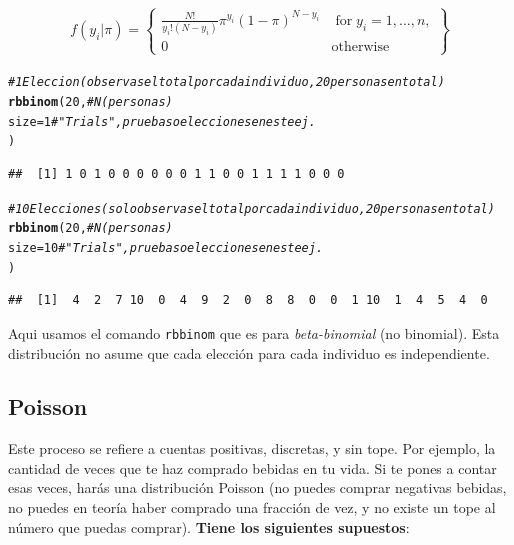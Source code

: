 \documentclass[onesided]{article}\usepackage[]{graphicx}\usepackage[]{color}
\makeatletter
\newcommand{\hlnum}[1]{\textcolor[rgb]{0.686,0.059,0.569}{#1}}%
\newcommand{\hlcom}[1]{\textcolor[rgb]{0.678,0.584,0.686}{\textit{#1}}}%
\newcommand{\hlstd}[1]{\textcolor[rgb]{0.345,0.345,0.345}{#1}}%
\newcommand{\hlkwc}[1]{\textcolor[rgb]{0.333,0.667,0.333}{#1}}%
\newcommand{\hlkwd}[1]{\textcolor[rgb]{0.737,0.353,0.396}{\textbf{#1}}}%
\newenvironment{kframe}{%
 \def\at@end@of@kframe{}%
 \ifinner\ifhmode%
  \def\at@end@of@kframe{\end{minipage}}%
  \begin{minipage}{\columnwidth}%
 \fi\fi%
 \def\FrameCommand##1{\hskip\@totalleftmargin \hskip-\fboxsep
 \colorbox{shadecolor}{##1}\hskip-\fboxsep
     \hskip-\linewidth \hskip-\@totalleftmargin \hskip\columnwidth}%
 \MakeFramed {\advance\hsize-\width
   \@totalleftmargin\z@ \linewidth\hsize
   \@setminipage}}%
 {\par\unskip\endMakeFramed%
 \at@end@of@kframe}
\newenvironment{knitrout}{}{} %
\makeatother
\begin{document}
\begin{equation}\label{Binomial}
\begin{split}
f(y_{i}|\pi) =	\begin{Bmatrix} \frac{N!}{y_{i}!(N-y_{i})} \pi^{y_{i}}(1-\pi)^{N-y_{i}} & \;\text{for}\; y_{i}=1,\ldots,n, \\ 
0 & \text{otherwise} \end{Bmatrix}
\end{split}
\end{equation}


\begin{knitrout}
\color{fgcolor}\begin{kframe}
\begin{alltt}
\hlcom{# 1 Eleccion (observas el total por cada individuo, 20 personas en total)}
\hlkwd{rbbinom}\hlstd{(}\hlnum{20}\hlstd{,} \hlcom{# N (personas)}
\hlkwc{size} \hlstd{=} \hlnum{1} \hlcom{# "Trials", pruebas o elecciones en este ej.}
\hlstd{)}
\end{alltt}
\begin{verbatim}
##  [1] 1 0 1 0 0 0 0 0 0 1 1 0 0 1 1 1 1 0 0 0
\end{verbatim}
\begin{alltt}
\hlcom{# 10 Elecciones (solo observas el total por cada individuo, 20 personas en total)}
\hlkwd{rbbinom}\hlstd{(}\hlnum{20}\hlstd{,} \hlcom{# N (personas)}
\hlkwc{size} \hlstd{=} \hlnum{10} \hlcom{# "Trials", pruebas o elecciones en este ej.}
\hlstd{)}
\end{alltt}
\begin{verbatim}
##  [1]  4  2  7 10  0  4  9  2  0  8  8  0  0  1 10  1  4  5  4  0
\end{verbatim}
\end{kframe}
\end{knitrout}

Aqui usamos el comando \texttt{rbbinom} que es para \emph{beta-binomial} (no binomial). Esta distribuci\'on no asume que cada elecci\'on para cada individuo es independiente.

\subsection{Poisson}

Este proceso se refiere a cuentas positivas, discretas, y sin tope. Por ejemplo, la cantidad de veces que te haz comprado bebidas en tu vida. Si te pones a contar esas veces, har\'as una distribuci\'on Poisson (no puedes comprar negativas bebidas, no puedes en teor\'ia haber comprado una fracci\'on de vez, y no existe un tope al n\'umero que puedas comprar). {\bf Tiene los siguientes supuestos}:
\end{document}
